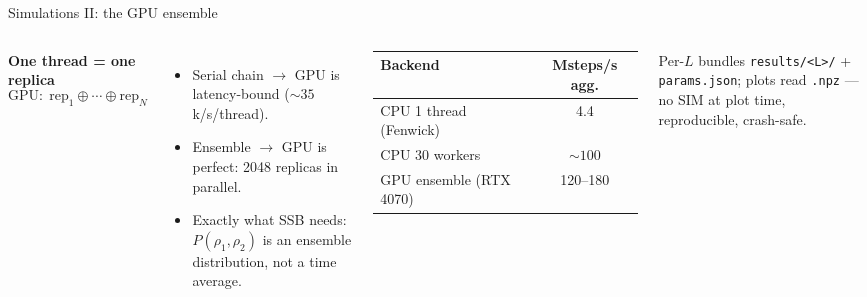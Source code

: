 \documentclass[aspectratio=169,10pt]{beamer}
\newcommand{\pos}[1]{\textcolor{positive}{#1}}
\newcommand{\con}[1]{\textcolor{negative}{#1}}
\begin{document}
\begin{frame}{Simulations II: the GPU ensemble}
  \begin{columns}[T]
      \textbf{One thread = one replica}
      \[
        \text{GPU}:\; \mathrm{rep}_1 \oplus \cdots \oplus \mathrm{rep}_N
      \]
      \begin{itemize}
        \item Serial chain $\to$ GPU is \con{latency-bound} ($\sim35$k/s/thread).
        \item \pos{Ensemble} $\to$ GPU is perfect: 2048 replicas in parallel.
        \item Exactly what SSB needs: $P(\rho_1,\rho_2)$ is an ensemble distribution, not a time average.
      \end{itemize}
      \centering
      \begin{tabular}{lc}
        \toprule
        Backend & Msteps/s agg. \\
        \midrule
        CPU 1 thread (Fenwick) & 4.4 \\
        CPU 30 workers & ${\sim}100$ \\
        GPU ensemble (RTX 4070) & 120--180 \\
        \bottomrule
      \end{tabular}
      \vspace{0.4em}
      {\scriptsize Per-$L$ bundles \texttt{results/<L>/} {\small +} \texttt{params.json}; plots read \texttt{.npz} — no SIM at plot time, reproducible, crash-safe.}
  \end{columns}
\end{frame}
\end{document}
